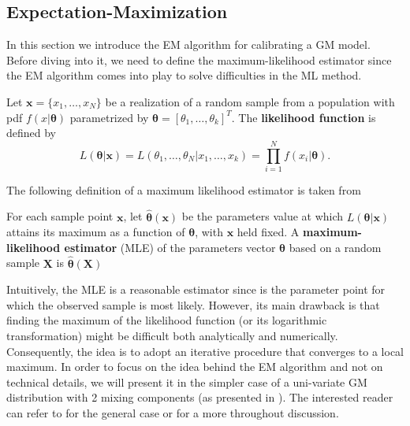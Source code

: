 \subsection{Expectation-Maximization}\label{subsec:EM}
In this section we introduce the EM algorithm for calibrating a GM model. Before diving into it, we need to define the maximum-likelihood estimator since the EM algorithm comes into play to solve difficulties in the ML method.
\begin{definition}
	Let $\bm{x}=\{x_1,\ldots,x_N\}$ be a realization of a random sample from a population with pdf $f(x\lvert\bm{\theta})$ parametrized by $\bm{\theta}=[\theta_1,\ldots,\theta_k]^T$. The \textbf{likelihood function} is defined by \[ L(\bm{\theta}\lvert\bm{x}) = L(\theta_1,\ldots,\theta_N\lvert x_1,\ldots,x_k) = \prod_{i=1}^{N}f(x_i\lvert\bm{\theta}). \]	
\end{definition}
The following definition of a maximum likelihood estimator is taken from \cite{casella2002}
\begin{definition}
	For each sample point $\bm{x}$, let $\widehat{\bm{\theta}}(\bm{x})$ be the parameters value at which $L(\bm{\theta}\lvert\bm{x})$  attains its maximum as a function of $\bm{\theta}$, with $\bm{x}$ held fixed. A \textbf{maximum-likelihood estimator} (MLE) of the parameters vector $\bm{\theta}$ based on a random sample $\bm{X}$ is $\widehat{\bm{\theta}}(\bm{X})$
\end{definition}
Intuitively, the MLE is a reasonable estimator since is the parameter point for which the observed sample is most likely. However, its main drawback is that finding the maximum of the likelihood function (or its logarithmic transformation) might be difficult both analytically and numerically. Consequently, the idea is to adopt an iterative procedure that converges to a local maximum.
In order to focus on the idea behind the EM algorithm and not on technical details, we will present it in the simpler case of a uni-variate GM distribution with 2 mixing components (as presented in \cite{hastie2009}). The interested reader can refer to \cite{hastie2009} for the general case or \cite{Plasse2013} for a more throughout discussion.

